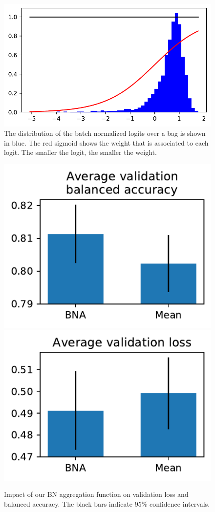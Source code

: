 \documentclass[final]{cvpr}
\begin{document}
\begin{figure}[t]
	\begin{center}
		\includegraphics[width=0.95\linewidth]{fig/aggreg_2.pdf}
	\end{center}
	\caption{The distribution of the batch normalized logits over a bag is shown in blue. The red sigmoid shows the weight that is associated to each logit. The smaller the logit, the smaller the weight.}
	\label{fig:aggreg}
\end{figure}

\begin{figure}[t]
	\begin{center}
		\includegraphics[width=0.47\linewidth]{fig/agg_bal_acc.pdf}
		\includegraphics[width=0.47\linewidth]{fig/agg_val_loss.pdf}
	\end{center}
	\caption{Impact of our BN aggregation function on validation loss and balanced accuracy.  The black bars indicate 95\% confidence intervals.}
	\label{fig:resnet}
\end{figure}
\end{document}
